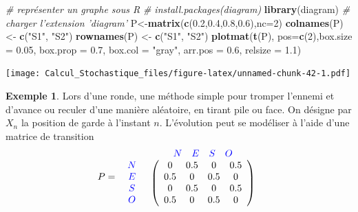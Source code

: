\documentclass[
]{book}
\newenvironment{Shaded}{\begin{snugshade}}{\end{snugshade}}
\newcommand{\CommentTok}[1]{\textcolor[rgb]{0.56,0.35,0.01}{\textit{#1}}}
\newcommand{\DataTypeTok}[1]{\textcolor[rgb]{0.13,0.29,0.53}{#1}}
\newcommand{\DecValTok}[1]{\textcolor[rgb]{0.00,0.00,0.81}{#1}}
\newcommand{\FloatTok}[1]{\textcolor[rgb]{0.00,0.00,0.81}{#1}}
\newcommand{\KeywordTok}[1]{\textcolor[rgb]{0.13,0.29,0.53}{\textbf{#1}}}
\newcommand{\NormalTok}[1]{#1}
\newcommand{\StringTok}[1]{\textcolor[rgb]{0.31,0.60,0.02}{#1}}
\theoremstyle{definition}
\theoremstyle{definition}
\newtheorem{example}{Exemple}[chapter]
\theoremstyle{definition}
\theoremstyle{remark}
\begin{document}
\begin{Shaded}
\begin{Highlighting}[]
\CommentTok{# représenter un graphe sous R}
\CommentTok{# install.packages(diagram)}
\KeywordTok{library}\NormalTok{(diagram) }\CommentTok{# charger l'extension 'diagram'}
\NormalTok{P<-}\KeywordTok{matrix}\NormalTok{(}\KeywordTok{c}\NormalTok{(}\FloatTok{0.2}\NormalTok{,}\FloatTok{0.4}\NormalTok{,}\FloatTok{0.8}\NormalTok{,}\FloatTok{0.6}\NormalTok{),}\DataTypeTok{nc=}\DecValTok{2}\NormalTok{)}
\KeywordTok{colnames}\NormalTok{(P) <-}\StringTok{ }\KeywordTok{c}\NormalTok{(}\StringTok{"S1"}\NormalTok{, }\StringTok{"S2"}\NormalTok{)}
\KeywordTok{rownames}\NormalTok{(P) <-}\StringTok{ }\KeywordTok{c}\NormalTok{(}\StringTok{"S1"}\NormalTok{, }\StringTok{"S2"}\NormalTok{)}
\KeywordTok{plotmat}\NormalTok{(}\KeywordTok{t}\NormalTok{(P), }\DataTypeTok{pos=}\KeywordTok{c}\NormalTok{(}\DecValTok{2}\NormalTok{),}\DataTypeTok{box.size =} \FloatTok{0.05}\NormalTok{, }\DataTypeTok{box.prop =} \FloatTok{0.7}\NormalTok{, }
      \DataTypeTok{box.col =} \StringTok{"gray"}\NormalTok{, }\DataTypeTok{arr.pos =} \FloatTok{0.6}\NormalTok{, }\DataTypeTok{relsize =} \FloatTok{1.1}\NormalTok{)}
\end{Highlighting}
\end{Shaded}

\texttt{[image: Calcul\_Stochastique\_files/figure-latex/unnamed-chunk-42-1.pdf]}

\begin{example}
\protect\hypertarget{exm:unnamed-chunk-43}{}{\label{exm:unnamed-chunk-43} }Lors d'une ronde, une méthode simple pour tromper l'ennemi et d'avance ou reculer d'une manière aléatoire, en tirant pile ou face. On désigne par \(X_n\) la position de garde à l'instant \(n\). L'évolution peut se modéliser à l'aide d'une matrice de transition
\[
 P=\begin{array}{c c} &
\begin{array}{c c c c} \color{blue}{N} & \color{blue}{E} & \color{blue}{S} & \color{blue}{O} \\
\end{array}
\\
\begin{array}{c c c c}
\color{blue}{N} \\
\color{blue}{E}\\
\color{blue}{S} \\
\color{blue}{O}
\end{array}
&
\left(
\begin{array}{c c c c}
0 & 0.5 & 0 & 0.5 \\
0.5 & 0 & 0.5 & 0 \\
0 & 0.5 & 0 & 0.5 \\
0.5 & 0 & 0.5 & 0
\end{array}
\right)
\end{array}\]
\end{example}
\end{document}
